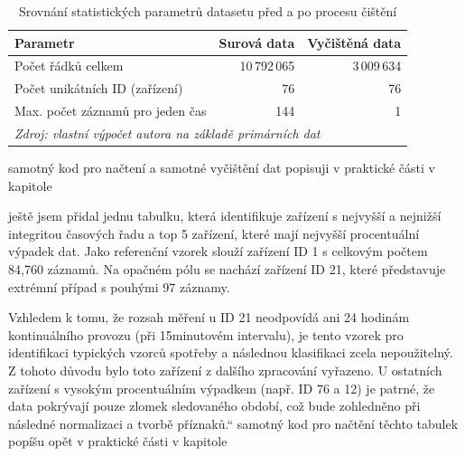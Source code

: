 \begin{table}[htbp]
\centering
\caption{Srovnání statistických parametrů datasetu před a po procesu čištění}
\label{tab:srovnani_dat}
\begin{tabular}{@{}lrr@{}}
\toprule
\textbf{Parametr} & \textbf{Surová data} & \textbf{Vyčištěná data} \\ \midrule
Počet řádků celkem & 10\,792\,065 & 3\,009\,634 \\
Počet unikátních ID (zařízení) & 76 & 76 \\
Max. počet záznamů pro jeden čas & 144 & 1 \\ \bottomrule
\multicolumn{3}{l}{\textit{Zdroj: vlastní výpočet autora na základě primárních dat}}
\end{tabular}
\end{table}

samotný kod pro načtení a samotné vyčištění dat popisuji v praktické části v kapitole 


ještě jsem přidal jednu tabulku, která identifikuje zařízení s nejvyšší a nejnižší integritou časových řadu a top 5 zařízení, které mají nejvyšší procentuální výpadek dat. 
 Jako referenční vzorek slouží zařízení ID 1 s celkovým počtem 84,760 záznamů. Na opačném pólu se nachází zařízení ID 21, které představuje extrémní případ s pouhými 97 záznamy.

Vzhledem k tomu, že rozsah měření u ID 21 neodpovídá ani 24 hodinám kontinuálního provozu (při 15minutovém intervalu), je tento vzorek pro identifikaci typických vzorců spotřeby a následnou klasifikaci zcela nepoužitelný. Z tohoto důvodu bylo toto zařízení z dalšího zpracování vyřazeno. U ostatních zařízení s vysokým procentuálním výpadkem (např. ID 76 a 12) je patrné, že data pokrývají pouze zlomek sledovaného období, což bude zohledněno při následné normalizaci a tvorbě příznaků.“
 samotný kod pro načtění těchto tabulek popíšu opět v praktické části v kapitole 

